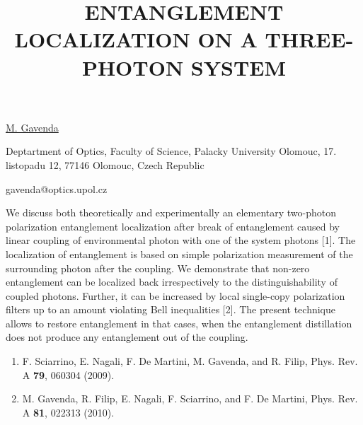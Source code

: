 \title{ENTANGLEMENT LOCALIZATION ON A THREE-PHOTON SYSTEM}

\underline{M. Gavenda} 

{\normalsize{\vspace{-4mm}
Deptartment of Optics, Faculty of Science, Palacky University Olomouc, 17. listopadu 12, 77146 Olomouc, Czech Republic

\email gavenda@optics.upol.cz}}

We discuss both theoretically and experimentally an elementary two-photon polarization entanglement
localization after break of entanglement caused by linear coupling of environmental photon
with one of the system photons [1]. The localization of entanglement is based on simple polarization
measurement of the surrounding photon after the coupling. We demonstrate that non-zero entanglement
can be localized back irrespectively to the distinguishability of coupled photons.
Further, it can be increased by local single-copy polarization filters up to an amount violating Bell inequalities [2]. The present technique allows to restore entanglement in that cases, when the entanglement distillation does not produce any entanglement out of the coupling.

\begin{enumerate}
\item F. Sciarrino, E. Nagali, F. De Martini, M. Gavenda, and R. Filip, Phys. Rev. A \textbf{79}, 060304 (2009).
\item M. Gavenda, R. Filip, E. Nagali, F. Sciarrino, and F. De Martini, Phys. Rev. A \textbf{81}, 022313 (2010).
\end{enumerate}

\vspace{\baselineskip} 